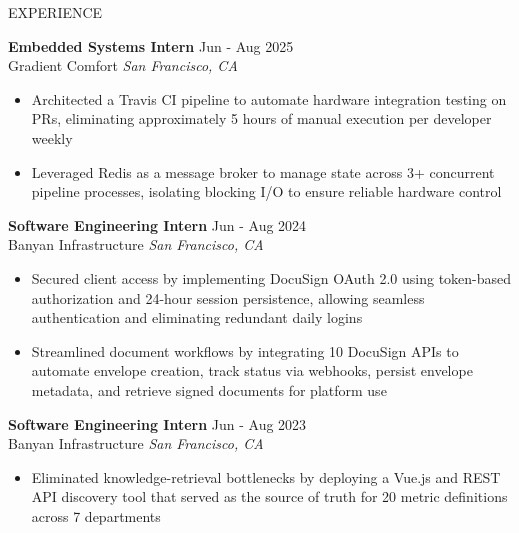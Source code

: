 \documentclass{resume} %
\begin{document}
\begin{rSection}{EXPERIENCE}

\textbf{Embedded Systems Intern} \hfill Jun - Aug 2025 \\
Gradient Comfort \hfill \textit{San Francisco, CA}
 \vspace{-.5em}
 \begin{itemize}
    \itemsep -6pt {}
     \item Architected a Travis CI pipeline to automate hardware integration testing on PRs, eliminating approximately 
     5 hours of manual execution per developer weekly
     \item Leveraged Redis as a message broker to manage state across 3+ concurrent pipeline processes,
     isolating blocking I/O to ensure reliable hardware control
 \end{itemize}

\textbf{Software Engineering Intern} \hfill Jun - Aug 2024 \\
Banyan Infrastructure \hfill \textit{San Francisco, CA}
 \vspace{-.5em}
 \begin{itemize}
    \itemsep -6pt {} 
     \item Secured client access by implementing DocuSign OAuth 2.0 using token-based authorization 
     and 24-hour session persistence, allowing seamless authentication and eliminating redundant daily logins
     \item Streamlined document workflows by integrating 10 DocuSign APIs to automate envelope creation, track status via
     webhooks, persist envelope metadata, and retrieve signed documents for platform use
 \end{itemize}

\textbf{Software Engineering Intern} \hfill Jun - Aug 2023 \\
Banyan Infrastructure \hfill \textit{San Francisco, CA}
 \vspace{-.5em}
 \begin{itemize}
    \itemsep -6pt {} 
     \item Eliminated knowledge-retrieval bottlenecks by deploying a Vue.js and REST API discovery tool
     that served as the source of truth for 20 metric definitions across 7 departments
 \end{itemize}

\end{rSection} 

\end{document}
